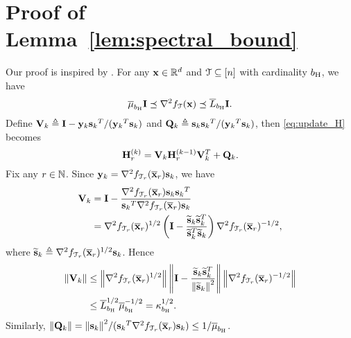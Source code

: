 \documentclass[10pt,twocolumn,journal]{IEEEtran}
\begin{document}
\section{Proof of Lemma~\ref{lem:spectral_bound}}\label{sec:proof_spec_bound}
Our proof is inspired by \cite{Gower_16}. For any $\bx\in\bbR^d$ and $\calT\subseteq [n]$ with cardinality $b_\rmH$, we have 
\begin{equation}
\barmu_{b_\rmH}\bI \preceq \nabla^2 f_{\calT}(\bx) \preceq \barL_{b_\rmH} \bI.
\end{equation}
Define $\bV_k \defeq \bI-{\by_k{\bs_k}^T}/({\by_k}^T\bs_k)$ and $\bQ_k \defeq {\bs_k{\bs_k}^T}/({\by_k}^T\bs_k)$, then \eqref{eq:update_H} becomes
\begin{equation}
\bH^{(k)}_r = \bV_k\bH^{(k-1)}_r\bV_k^T + \bQ_k.\label{eq:update_H_VQ}
\end{equation} 
Fix any $r\in\bbN$. %
Since $\by_k = \nabla^2 f_{\calT_r}(\barbx_r)\bs_k$, we have 
\begin{align*}
\bV_k &= \bI-\frac{\nabla^2 f_{\calT_r}(\barbx_r)\bs_k{\bs_k}^T}{{\bs_k}^T\nabla^2 f_{\calT_r}(\barbx_r)\bs_k}\\
&= \nabla^2 f_{\calT_r}(\barbx_r)^{1/2}\left(\bI - \frac{\tilbs_k{\tilbs_k}^T}{{\tilbs_k}^T\tilbs_k}\right)\nabla^2 f_{\calT_r}(\barbx_r)^{-1/2},
\end{align*}
where $\tilbs_k \defeq \nabla^2 f_{\calT_r}(\barbx_r)^{1/2}\bs_k$. %
Hence 
\begin{align*}
\norm{\bV_k} &\le \norm{\nabla^2 f_{\calT_r}(\barbx_r)^{1/2}}\norm{\bI - \frac{\tilbs_k{\tilbs_k}^T}{\norm{\tilbs_k}^2}}\norm{\nabla^2 f_{\calT_r}(\barbx_r)^{-1/2}}\\
&\le \barL_{b_\rmH}^{1/2} \barmu_{b_\rmH}^{-1/2} = \kappa_{b_\rmH}^{1/2}.
\end{align*}
Similarly,
$\norm{\bQ_k} = {\norm{\bs_k}^2}/({\bs_k}^T\nabla^2 f_{\calT_r}(\barbx_r)\bs_k) \le {1}/\barmu_{b_\rmH}$. 
\end{document}
